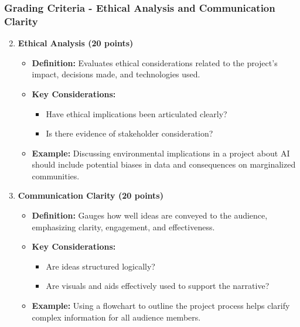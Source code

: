 \documentclass[aspectratio=169]{beamer}
\begin{document}
\begin{frame}[fragile]
    \frametitle{Grading Criteria - Ethical Analysis and Communication Clarity}
    \begin{enumerate}
        \setcounter{enumi}{1}
        \item \textbf{Ethical Analysis (20 points)}
        \begin{itemize}
            \item \textbf{Definition:} Evaluates ethical considerations related to the project’s impact, decisions made, and technologies used.
            \item \textbf{Key Considerations:}
            \begin{itemize}
                \item Have ethical implications been articulated clearly?
                \item Is there evidence of stakeholder consideration?
            \end{itemize}
            \item \textbf{Example:} Discussing environmental implications in a project about AI should include potential biases in data and consequences on marginalized communities.
        \end{itemize}
        
        \item \textbf{Communication Clarity (20 points)}
        \begin{itemize}
            \item \textbf{Definition:} Gauges how well ideas are conveyed to the audience, emphasizing clarity, engagement, and effectiveness.
            \item \textbf{Key Considerations:}
            \begin{itemize}
                \item Are ideas structured logically?
                \item Are visuals and aids effectively used to support the narrative?
            \end{itemize}
            \item \textbf{Example:} Using a flowchart to outline the project process helps clarify complex information for all audience members.
        \end{itemize}
    \end{enumerate}
\end{frame}
\end{document}
